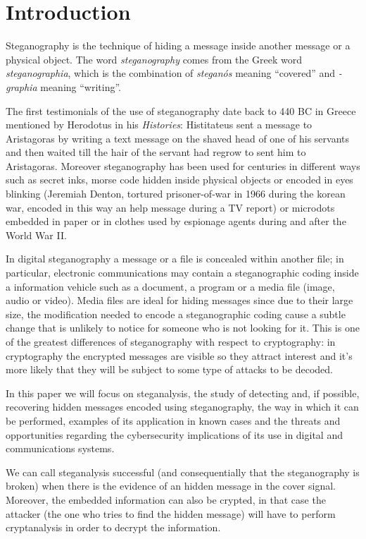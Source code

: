 \documentclass[../../main.tex]{subfiles}
\begin{document}
\section{Introduction}

Steganography is the technique of hiding a message inside another message or a
physical object.\cite{steganography-definition}
The word \textit{steganography} comes from the Greek word
\textit{steganographia}, which is the combination of \textit{steganós} meaning
``covered'' and \textit{-graphia} meaning ``writing''.

The first testimonials of the use of steganography date back to 440 BC in Greece
mentioned by Herodotus in his \emph{Histories}: Histitateus sent a message to
Aristagoras by writing a text message on the shaved head of one of his servants
and then waited till the hair of the servant had regrow to sent him to
Aristagoras.
Moreover steganography has been used for centuries in different ways such as
secret inks, morse code hidden inside physical objects or encoded in eyes
blinking (Jeremiah Denton, tortured prisoner-of-war in 1966 during the korean
war, encoded in this way an help message during a TV report) or microdots
embedded in paper or in clothes used by espionage agents during and after the
World War II.

In digital steganography a message or a file is concealed within another file;
in particular, electronic communications may contain a steganographic coding
inside a information vehicle such as a document, a program or a media file
(image, audio or video).
Media files are ideal for hiding messages since due to their large size, the
modification needed to encode a steganographic coding cause a subtle change that
is unlikely to notice for someone who is not looking for it.
This is one of the greatest differences of steganography with respect to
cryptography: in cryptography the encrypted messages are visible so they attract
interest and it's more likely that they will be subject to some type of attacks
to be decoded.

In this paper we will focus on steganalysis, the study of detecting and, if
possible, recovering hidden messages encoded using steganography, the way in
which it can be performed, examples of its application in known cases and
the threats and opportunities regarding the cybersecurity implications of its
use in digital and communications systems.

We can call steganalysis successful (and consequentially that the steganography
is broken) when there is the evidence of an hidden message in the cover signal.
Moreover, the embedded information can also be crypted, in that case the
attacker (the one who tries to find the hidden message) will have to perform
cryptanalysis in order to decrypt the information.
\end{document}
